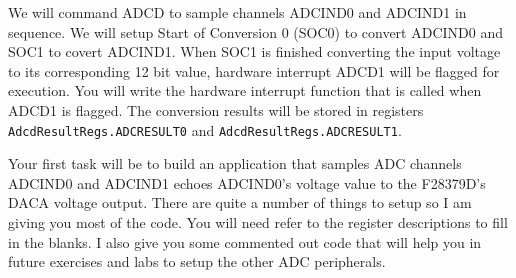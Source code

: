\documentclass[11pt]{article}
\begin{document}
We will command ADCD to sample channels ADCIND0 and ADCIND1 in sequence. We will setup Start of Conversion 0 (SOC0) to convert ADCIND0 and SOC1 to covert ADCIND1. When SOC1 is finished converting the input voltage to its corresponding 12 bit value, hardware interrupt ADCD1 will be flagged for execution. You will write the hardware interrupt function that is called when ADCD1 is flagged. The conversion results will be stored in registers \texttt{AdcdResultRegs.ADCRESULT0} and \texttt{AdcdResultRegs.ADCRESULT1}.

Your first task will be to build an application that samples ADC channels ADCIND0 and ADCIND1 echoes ADCIND0’s voltage value to the F28379D’s DACA voltage output. There are quite a number of things to setup so I am giving you most of the code. You will need refer to the register descriptions to fill in the blanks. I also give you some commented out code that will help you in future exercises and labs to setup the other ADC peripherals.
%
\end{document}
